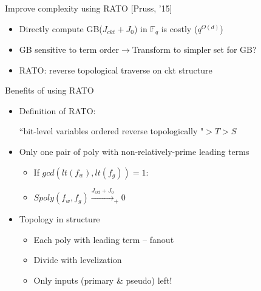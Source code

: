 \documentclass[xcolor=dvipsnames]{beamer}
\newcommand{\Fq}{{\mathbb{F}}_{q}}
\newcommand{\bi}{\begin{itemize}}
\newcommand{\ei}{\end{itemize}}
\begin{document}
\begin{frame}{\large{Improve complexity using RATO [Pruss, '15]}}
\bi
\item Directly compute GB($J_{ckt}+J_0$) in $\Fq$ is costly ($q^{O(d)}$)
\item GB sensitive to term order$\to$Transform to simpler set for GB?
\pause
\item RATO: reverse topological traverse on ckt structure
\ei
\begin{figure}[H]
\end{figure}
\end{frame}
\begin{frame}{\large{Benefits of using RATO}}
\bi
\item Definition of RATO:\par 
``bit-level variables ordered reverse topologically "$ > T>S$
\item Only one pair of poly with non-relatively-prime leading terms
	\bi
	\item If $gcd(lt(f_w),lt(f_g)) = 1$:
	\item $Spoly(f_w,f_g) \xrightarrow{J_{ckt}+J_0}_+ 0$
	\ei
\item Topology in structure
	\bi
	\item Each poly with leading term -- fanout
	\item Divide with levelization
	\item Only inputs (primary \& pseudo) left!
	\ei
\ei
\end{frame}
\end{document}
